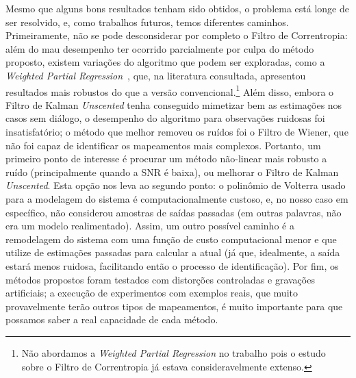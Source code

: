 Mesmo que alguns bons resultados tenham sido obtidos, o problema está longe de ser resolvido, e, como trabalhos futuros, temos diferentes caminhos. Primeiramente, não se pode desconsiderar por completo o Filtro de Correntropia: além do mau desempenho ter ocorrido parcialmente por culpa do método proposto, existem variações do algoritmo que podem ser exploradas, como a \textit{Weighted Partial Regression}~\cite{pokharel-2007}, que, na literatura consultada, apresentou resultados mais robustos do que a versão convencional.\footnote{Não abordamos a \textit{Weighted Partial Regression} no trabalho pois o estudo sobre o Filtro de Correntropia já estava consideravelmente extenso.} Além disso, embora o Filtro de Kalman \textit{Unscented} tenha conseguido mimetizar bem as estimações nos casos sem diálogo, o desempenho do algoritmo para observações ruidosas foi insatisfatório; o método que melhor removeu os ruídos foi o Filtro de Wiener, que não foi capaz de identificar os mapeamentos mais complexos. Portanto, um primeiro ponto de interesse é procurar um método não-linear mais robusto a ruído (principalmente quando a SNR é baixa), ou melhorar o Filtro de Kalman \textit{Unscented}. Esta opção nos leva ao segundo ponto: o polinômio de Volterra usado para a modelagem do sistema é computacionalmente custoso, e, no nosso caso em específico, não considerou amostras de saídas passadas (em outras palavras, não era um modelo realimentado). Assim, um outro possível caminho é a remodelagem do sistema com uma função de custo computacional menor e que utilize de estimações passadas para calcular a atual (já que, idealmente, a saída estará menos ruidosa, facilitando então o processo de identificação). Por fim, os métodos propostos foram testados com distorções controladas e gravações artificiais; a execução de experimentos com exemplos reais, que muito provavelmente terão outros tipos de mapeamentos, é muito importante para que possamos saber a real capacidade de cada método.